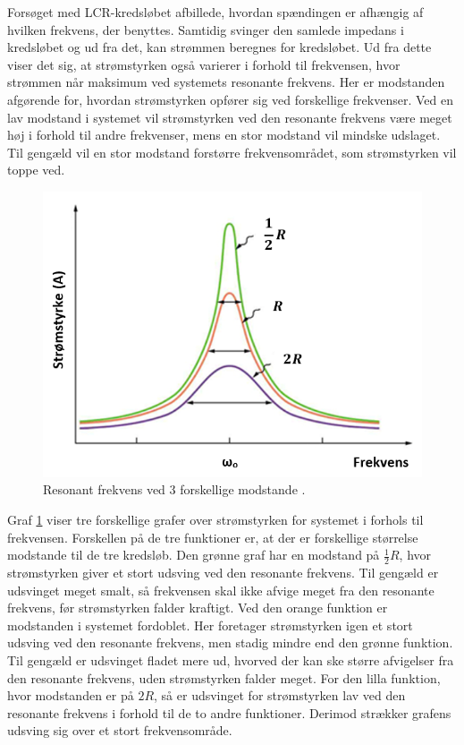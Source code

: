 Forsøget med LCR-kredsløbet afbillede, hvordan spændingen er afhængig af hvilken frekvens, der benyttes. Samtidig svinger den samlede impedans i kredsløbet og ud fra det, kan strømmen beregnes for kredsløbet. Ud fra dette viser det sig, at strømstyrken også varierer i forhold til frekvensen, hvor strømmen når maksimum ved systemets resonante frekvens. Her er modstanden afgørende for, hvordan strømstyrken opfører sig ved forskellige frekvenser. Ved en lav modstand i systemet vil strømstyrken ved den resonante frekvens være meget høj i forhold til andre frekvenser, mens en stor modstand vil mindske udslaget. Til gengæld vil en stor modstand forstørre frekvensområdet, som strømstyrken vil toppe ved. \cite{fysikbog}

\begin{figure}[H]
\centering
\includegraphics[scale=0.75]{Vildledning/Schematics/Resonanskurver}
\caption{Resonant frekvens ved 3 forskellige modstande \cite{Bresonant}.}
\label{figure:resonantfrekvens}
\end{figure}

Graf \ref{figure:resonantfrekvens} viser tre forskellige grafer over strømstyrken for systemet i forhols til frekvensen. Forskellen på de tre funktioner er, at der er forskellige størrelse modstande til de tre kredsløb. Den grønne graf har en modstand på $\frac{1}{2} R$, hvor strømstyrken giver et stort udsving ved den resonante frekvens. Til gengæld er udsvinget meget smalt, så frekvensen skal ikke afvige meget fra den resonante frekvens, før strømstyrken falder kraftigt. Ved den orange funktion er modstanden i systemet fordoblet. Her foretager strømstyrken igen et stort udsving ved den resonante frekvens, men stadig mindre end den grønne funktion. Til gengæld er udsvinget fladet mere ud, hvorved der kan ske større afvigelser fra den resonante frekvens, uden strømstyrken falder meget. For den lilla funktion, hvor modstanden er på $2 R$, så er udsvinget for strømstyrken lav ved den resonante frekvens i forhold til de to andre funktioner. Derimod strækker grafens udsving sig over et stort frekvensområde.

